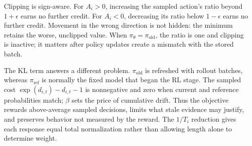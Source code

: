 Clipping is sign-aware. For $A_i>0$, increasing the sampled action's ratio beyond
$1+\epsilon$ earns no further credit. For $A_i<0$, decreasing its ratio below
$1-\epsilon$ earns no further credit. Movement in the wrong direction is not hidden: the
minimum retains the worse, unclipped value. When $\pi_\theta=\pi_{\mathrm{old}}$, the ratio
is one and clipping is inactive; it matters after policy updates create a mismatch with the
stored batch.

The KL term answers a different problem. $\pi_{\mathrm{old}}$ is refreshed with rollout
batches, whereas $\pi_{\mathrm{ref}}$ is normally the fixed model that began the RL stage.
The sampled cost $\exp(d_{i,t})-d_{i,t}-1$ is nonnegative and zero when current and
reference probabilities match; $\beta$ sets the price of cumulative drift. Thus the
objective rewards above-average sampled decisions, limits what stale evidence may justify,
and preserves behavior not measured by the reward. The $1/T_i$ reduction gives each
response equal total normalization rather than allowing length alone to determine weight.
